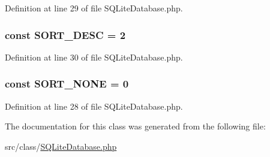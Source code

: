 Definition at line 29 of file S\+Q\+Lite\+Database.\+php.

\hypertarget{class_s_q_lite_database_a0e633ab431ae1e5cc483a37cfe73bb09}{}
\subsubsection[{S\+O\+R\+T\+\_\+\+D\+E\+S\+C}]{\setlength{\rightskip}{0pt plus 5cm}const S\+O\+R\+T\+\_\+\+D\+E\+S\+C = 2}\label{class_s_q_lite_database_a0e633ab431ae1e5cc483a37cfe73bb09}


Definition at line 30 of file S\+Q\+Lite\+Database.\+php.

\hypertarget{class_s_q_lite_database_af3826c676cb54905f393f9d1f7ad48ea}{}
\subsubsection[{S\+O\+R\+T\+\_\+\+N\+O\+N\+E}]{\setlength{\rightskip}{0pt plus 5cm}const S\+O\+R\+T\+\_\+\+N\+O\+N\+E = 0}\label{class_s_q_lite_database_af3826c676cb54905f393f9d1f7ad48ea}


Definition at line 28 of file S\+Q\+Lite\+Database.\+php.



The documentation for this class was generated from the following file\+:\begin{DoxyCompactItemize}
\item 
src/class/\hyperlink{_s_q_lite_database_8php}{S\+Q\+Lite\+Database.\+php}\end{DoxyCompactItemize}
